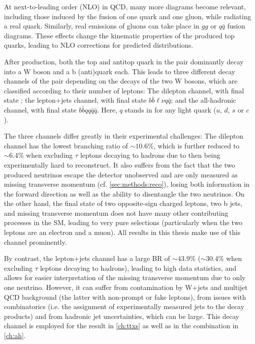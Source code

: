 At next-to-leading order (NLO) in QCD, many more diagrams become relevant, including those induced by the fusion of one quark and one gluon, while radiating a real quark. Similarly, real emissions of gluons can take place in $gg$ or $q\bar{q}$ fusion diagrams. These effects change the kinematic properties of the produced top quarks, leading to NLO corrections for predicted distributions.

After production, both the top and antitop quark in the \ttbar pair dominantly decay into a W boson and a b (anti)quark each. This leads to three different decay channels of the \ttbar pair depending on the decays of the two W bosons, which are classified according to their number of leptons: The dilepton channel, with final state \bbllnunu; the lepton+jets channel, with final state $b \bar{b} \ell \nu q \bar{q}$; and the all-hadronic channel, with final state $b \bar{b} q q \bar{q} \bar{q}$. Here, $q$ stands in for any light quark ($u$, $d$, $s$ or $c$).

The three channels differ greatly in their experimental challenges: The dilepton channel has the lowest branching ratio of $\sim10.6\%$, which is further reduced to $\sim6.4\%$ when excluding $\tau$ leptons decaying to hadrons due to then being experimentally hard to reconstruct. It also suffers from the fact that the two produced neutrinos escape the detector unobserved and are only measured as missing transverse momentum (cf. \cref{sec:methods:reco}), losing both information in the forward direction as well as the ability to disentangle the two neutrinos. On the other hand, the final state of two opposite-sign charged leptons, two b jets, and missing transverse momentum does not have many other contributing processes in the SM, leading to very pure selections (particularly when the two leptons are an electron and a muon). All results in this thesis make use of this channel prominently.

By contrast, the lepton+jets channel has a large BR of $\sim43.9\%$ ($\sim30.4\%$ when excluding $\tau$ leptons decaying to hadrons), leading to high data statistics, and allows for easier interpretation of the missing transverse momentum due to only one neutrino. However, it can suffer from contamination by W+jets and multijet QCD background (the latter with non-prompt or fake leptons), from issues with combinatorics (i.e. the assignment of experimentally measured jets to the decay products) and from hadronic jet uncertainties, which can be large. This decay channel is employed for the result in \cref{ch:ttxs} as well as in the combination in \cref{ch:ah}.

